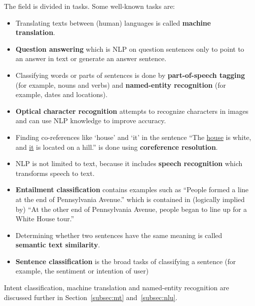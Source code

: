 The field is divided in tasks.
Some well-known tasks are:
\begin{itemize}
    \item Translating texts between (human) languages is called \textbf{machine translation}.
    \item \textbf{Question answering} which is NLP on question sentences only to point to an answer in text or generate an answer sentence.
    \item Classifying words or parts of sentences is done by \textbf{part-of-speech tagging} (for example, nouns and verbs) and \textbf{named-entity recognition} (for example, dates and locations).
    \item \textbf{Optical character recognition} attempts to recognize characters in images and can use NLP knowledge to improve accuracy.
    \item Finding co-references like `house' and `it' in the sentence ``The \underline{house} is white, and \underline{it} is located on a hill.'' is done using \textbf{coreference resolution}.
    \item NLP is not limited to text, because it includes \textbf{speech recognition} which transforms speech to text.
    \item \textbf{Entailment classification} contains examples such as ``People formed a line at the end of Pennsylvania Avenue.'' which is contained in (logically implied by) ``At the other end of Pennsylvania Avenue, people began to line up for a White House tour.''~\cite{williams2018}
    \item Determining whether two sentences have the same meaning is called \textbf{semantic text similarity}.
    \item \textbf{Sentence classification} is the broad tasks of classifying a sentence (for example, the sentiment or intention of user)
\end{itemize}
Intent classification, machine translation and named-entity recognition are discussed further in Section~\ref{subsec:mt} and~\ref{subsec:nlu}.

